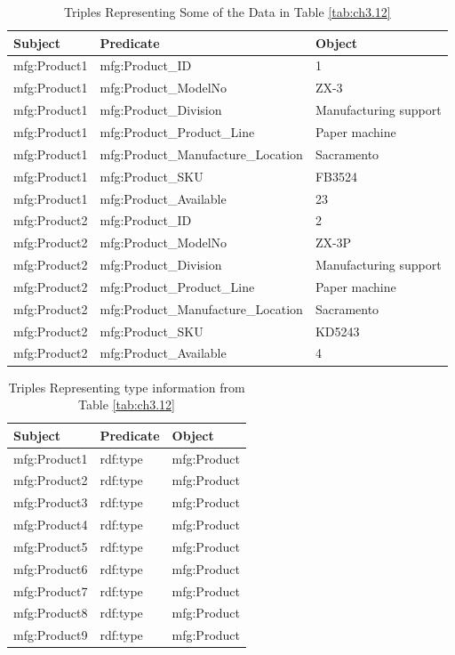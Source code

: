 \begin{challenge}
\begin{table}[h]
\centering
\begin{tabular}{||l l l ||} 
 \hline
 Subject&Predicate&Object \\ [0.5ex] 
 \hline\hline
mfg:Product1&mfg:Product\_ID&1 \\
mfg:Product1&mfg:Product\_ModelNo&ZX-3 \\
mfg:Product1&mfg:Product\_Division&Manufacturing support \\
mfg:Product1&mfg:Product\_Product\_Line&Paper machine \\
mfg:Product1&mfg:Product\_Manufacture\_Location&Sacramento \\
mfg:Product1&mfg:Product\_SKU&FB3524 \\
mfg:Product1&mfg:Product\_Available&23 \\
mfg:Product2&mfg:Product\_ID&2\\
mfg:Product2&mfg:Product\_ModelNo&ZX-3P\\
mfg:Product2&mfg:Product\_Division&Manufacturing support \\
mfg:Product2&mfg:Product\_Product\_Line&Paper machine \\
mfg:Product2&mfg:Product\_Manufacture\_Location&Sacramento\\
mfg:Product2&mfg:Product\_SKU&KD5243\\
mfg:Product2&mfg:Product\_Available&4\\
\hline
\end{tabular}
\caption{Triples Representing Some of the Data in Table \ref{tab:ch3.12}}
\label{tab:ch3.13}
\end{table}

\begin{table}[h]
\centering
\begin{tabular}{||l l l ||} 
 \hline
 Subject&Predicate&Object \\ [0.5ex] 
 \hline\hline
mfg:Product1&rdf:type&mfg:Product\\
mfg:Product2&rdf:type&mfg:Product\\
mfg:Product3&rdf:type&mfg:Product\\
mfg:Product4&rdf:type&mfg:Product\\
mfg:Product5&rdf:type&mfg:Product\\
mfg:Product6&rdf:type&mfg:Product\\
mfg:Product7&rdf:type&mfg:Product\\
mfg:Product8&rdf:type&mfg:Product\\
mfg:Product9&rdf:type&mfg:Product\\
\hline
\end{tabular}
\caption{Triples Representing type information from Table \ref{tab:ch3.12}}
\label{tab:ch3.14}
\end{table}

\end{challenge}

